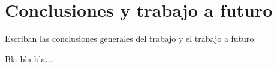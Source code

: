
\chapter{Conclusiones y trabajo a futuro}

Escriban las conclusiones generales del trabajo y el trabajo a futuro.

Bla bla bla...
